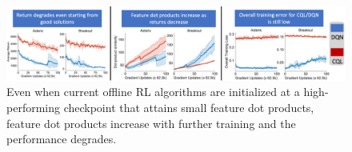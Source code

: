 \begin{figure}[t]
    \centering
    \includegraphics[width=0.99\linewidth]{figures_iclr/return_degrades.pdf}
    \vspace{-0.3cm}
    \caption{\small{Even when current offline RL algorithms are initialized at a high-performing checkpoint that attains small feature dot products, feature dot products increase with further training and the performance degrades.}}  
    \label{fig:stability}
    \vspace{-0.55cm}
\end{figure}



